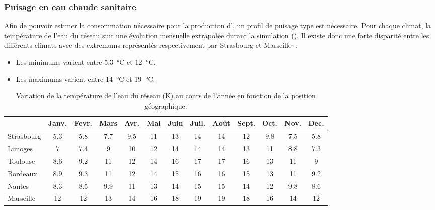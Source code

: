 \subsubsection{Puisage en eau chaude sanitaire} %
\label{ssub:puisage_en_eau_chaude_sanitaire}
Afin de pouvoir estimer la consommation nécessaire pour la production d’, un profil
de puisage type est nécessaire. Pour chaque climat, la température de l’eau du réseau suit
une évolution mensuelle extrapolée durant la simulation
(). Il existe donc une forte disparité entre les différents climats
avec des extremums représentés respectivement par Strasbourg et Marseille~:
\begin{itemize}
    \item Les minimums varient entre \SI{5.3}{\celsius} et \SI{12}{\celsius}.
    \item Les maximums varient entre \SI{14}{\celsius} et \SI{19}{\celsius}.
\end{itemize}

\begin{table}
\centering
\caption[Variation de la température de l'eau du réseau en fonction de la position géographique]
        {Variation de la température de l'eau du réseau (\si{\kelvin}) au cours
         de l'année en fonction de la position géographique.}
\label{tab:temp_eau}
\begin{tabular}{l*{12}{c}}
    \toprule
               & Janv. & Fevr. & Mars & Avr. & Mai & Juin & Juil. & Août & Sept. & Oct. & Nov. & Dec. \\
    \midrule
    Strasbourg & \num{5.3}   & \num{5.8}   & \num{7.7}  & \num{9.5}  & \num{11}  & \num{13}   & \num{14}    & \num{14}   & \num{12}    & \num{9.8}  & \num{7.5}  & \num{5.8}  \\
    Limoges    & \num{7}     & \num{7.4}   & \num{9}    & \num{10}   & \num{12}  & \num{14}   & \num{14}    & \num{14}   & \num{13}    & \num{11}   & \num{8.8}  & \num{7.3}  \\
    Toulouse   & \num{8.6}   & \num{9.2}   & \num{11}   & \num{12}   & \num{14}  & \num{16}   & \num{17}    & \num{17}   & \num{16}    & \num{13}   & \num{11}   & \num{9}    \\
    Bordeaux   & \num{8.9}   & \num{9.3}   & \num{11}   & \num{12}   & \num{14}  & \num{15}   & \num{16}    & \num{16}   & \num{15}    & \num{13}   & \num{11}   & \num{9.2}  \\
    Nantes     & \num{8.3}   & \num{8.5}   & \num{9.9}  & \num{11}   & \num{13}  & \num{14}   & \num{15}    & \num{15}   & \num{14}    & \num{12}   & \num{9.8}  & \num{8.6}  \\
    Marseille  & \num{12}    & \num{12}    & \num{13}   & \num{14}   & \num{16}  & \num{18}   & \num{19}    & \num{19}   & \num{18}    & \num{16}   & \num{14}   & \num{12}   \\
    \bottomrule
\end{tabular}
\end{table}


